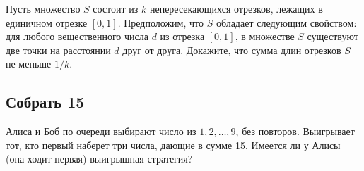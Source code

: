 Пусть множество $S$ состоит из $k$ непересекающихся отрезков, лежащих в единичном отрезке $[0,1]$.
Предположим, что $S$ обладает следующим свойством: для любого вещественного числа $d$ из отрезка $[0,1]$, в множестве $S$ существуют две точки на расстоянии $d$ друг от друга.
Докажите, что сумма длин отрезков $S$ не меньше $1/k$.

 
\subsection*{Собрать 15} %

Алиса и Боб по очереди выбирают число из $1, 2,\dots,9$, без повторов.
Выигрывает тот, кто первый наберет три числа, дающие в сумме 15.
Имеется ли у Алисы (она ходит первая)
выигрышная стратегия?
